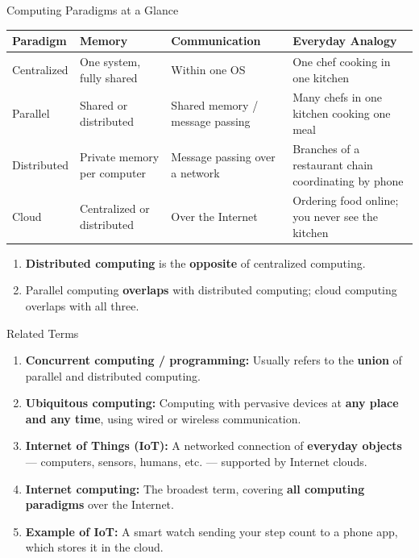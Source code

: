 \begin{frame}{Computing Paradigms at a Glance}
\begin{table}
\centering
\renewcommand{\arraystretch}{1.35}
\scriptsize
\begin{tabular}{|p{2.4cm}|p{3.2cm}|p{3.4cm}|p{3.8cm}|}
\hline
\textbf{Paradigm} & \textbf{Memory} & \textbf{Communication} & \textbf{Everyday Analogy} \\ \hline
Centralized & One system, fully shared & Within one OS & One chef cooking in one kitchen \\ \hline
Parallel & Shared or distributed & Shared memory / message passing & Many chefs in one kitchen cooking one meal \\ \hline
Distributed & Private memory per computer & Message passing over a network & Branches of a restaurant chain coordinating by phone \\ \hline
Cloud & Centralized or distributed & Over the Internet & Ordering food online; you never see the kitchen \\ \hline
\end{tabular}
\end{table}
\begin{enumerate}
\item<1-> \textbf{Distributed computing} is the \textbf{opposite} of centralized computing.
\item<2-> Parallel computing \textbf{overlaps} with distributed computing; cloud computing overlaps with all three.
\end{enumerate}
\end{frame}

\begin{frame}{Related Terms}
\begin{enumerate}
\item<1-> \textbf{Concurrent computing / programming:} Usually refers to the \textbf{union} of parallel and distributed computing.
\item<2-> \textbf{Ubiquitous computing:} Computing with pervasive devices at \textbf{any place and any time}, using wired or wireless communication.
\item<3-> \textbf{Internet of Things (IoT):} A networked connection of \textbf{everyday objects} --- computers, sensors, humans, etc. --- supported by Internet clouds.
\item<4-> \textbf{Internet computing:} The broadest term, covering \textbf{all computing paradigms} over the Internet.
\item<5-> \textbf{Example of IoT:} A smart watch sending your step count to a phone app, which stores it in the cloud.
\end{enumerate}
\end{frame}

